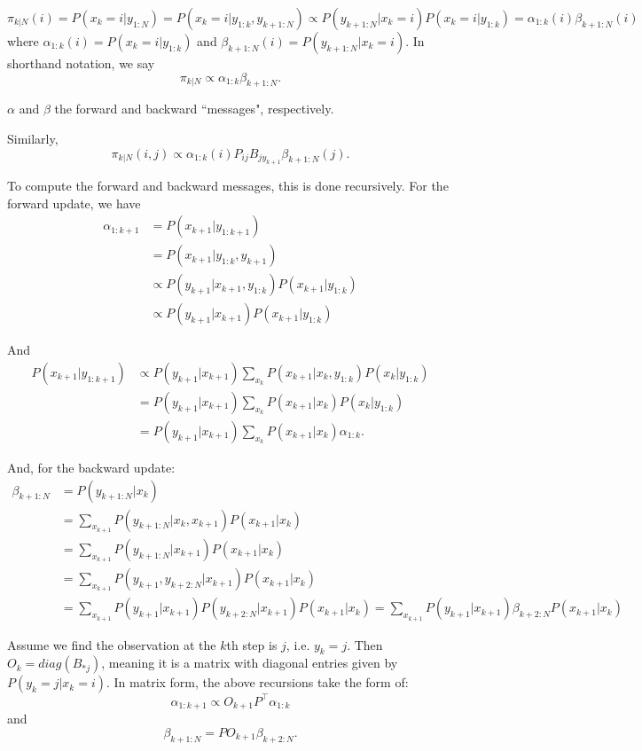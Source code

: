 \documentclass[english]{article}
\numberwithin{equation}{section}
\begin{document}
	$$\pi_{k|N}(i)=P(x_k=i|y_{1:N})=P(x_k=i|y_{1:k},y_{k+1:N})\propto P(y_{k+1:N}|x_k=i)P(x_k=i|y_{1:k})=\alpha_{1:k}(i)\beta_{k+1:N}(i)$$ where $\alpha_{1:k}(i) = P(x_k=i|y_{1:k})$ and $\beta_{k+1:N}(i)=P(y_{k+1:N}|x_k=i)$. In shorthand notation, we say $$\pi_{k|N}\propto \alpha_{1:k}\beta_{k+1:N}.$$
	
	$\alpha$ and $\beta$ the forward and backward ``messages", respectively.
	
	Similarly, $$\pi_{k|N}(i,j)\propto \alpha_{1:k}(i)P_{ij}B_{jy_{k+1}}\beta_{k+1:N}(j).$$
	
	To compute the forward and backward messages, this is done recursively. For the forward update, we have
	\begin{align*}
	\alpha_{1:k+1} &=P(x_{k+1}|y_{1:k+1}) \\
	&=P(x_{k+1}|y_{1:k},y_{k+1}) \\
	&\propto P(y_{k+1}|x_{k+1},y_{1:k})P(x_{k+1}|y_{1:k}) \\
	&\propto P(y_{k+1}|x_{k+1}) P(x_{k+1}|y_{1:k}) 
	\end{align*}
	
	And \begin{align*}
	P(x_{k+1}|y_{1:k+1}) &\propto P(y_{k+1}|x_{k+1})\sum_{x_k} P(x_{k+1}|x_k,y_{1:k})P(x_k|y_{1:k}) \\
	&= P(y_{k+1}|x_{k+1})\sum_{x_k} P(x_{k+1}|x_k)P(x_k|y_{1:k}) \\
	&= P(y_{k+1}|x_{k+1})\sum_{x_k} P(x_{k+1}|x_k)\alpha_{1:k}.
	\end{align*}
	
	And, for the backward update:
	\begin{align*}
	\beta_{k+1:N} &=P(y_{k+1:N}|x_k) \\
	&=\sum_{x_{k+1}}P(y_{k+1:N}|x_k,x_{k+1})P(x_{k+1}|x_k) \\
	&= \sum_{x_{k+1}}P(y_{k+1:N}|x_{k+1})P(x_{k+1}|x_k) \\
	&= \sum_{x_{k+1}}P(y_{k+1},y_{k+2:N}|x_{k+1})P(x_{k+1}|x_k) \\
	&= \sum_{x_{k+1}}P(y_{k+1}|x_{k+1})P(y_{k+2:N}|x_{k+1})P(x_{k+1}|x_k) = \sum_{x_{k+1}} P(y_{k+1}|x_{k+1})\beta_{k+2:N}P(x_{k+1}|x_k)
	\end{align*}
	
	Assume we find the observation at the $k$th step is $j$, i.e. $y_k=j$. Then $O_{k} = diag(B_{*j})$, meaning it is a matrix with diagonal entries given by $P(y_k=j|x_k=i)$. In matrix form, the above recursions take the form of:
	$$\alpha_{1:k+1} \propto O_{k+1}P^{\top} \alpha_{1:k}$$
	and
	$$\beta_{k+1:N}=PO_{k+1}\beta_{k+2:N}.$$
	
\end{document}
